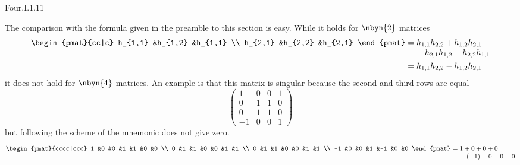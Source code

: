 \begin{ans}{Four.I.1.11}
      \begin{exparts}
        \partsitem The comparison with the formula given in the preamble to
          this section is easy.
        \partsitem While it holds for \( \nbyn{2} \) matrices
          \begin{align*}
            \begin{pmat}{cc|c}
              h_{1,1} &h_{1,2} &h_{1,1} \\
              h_{2,1} &h_{2,2} &h_{2,1}
            \end{pmat}
            &=\begin{array}[t]{@{}l@{}}
              h_{1,1}h_{2,2}+h_{1,2}h_{2,1}  \\
              \>-h_{2,1}h_{1,2}-h_{2,2}h_{1,1}
            \end{array}                                     \\
            &=h_{1,1}h_{2,2}-h_{1,2}h_{2,1}
          \end{align*}
          it does not hold for \( \nbyn{4} \) matrices.
          An example is that this matrix is
          singular because the second and third rows are equal
          \begin{equation*}
            \begin{pmatrix}
              1  &0  &0  &1   \\
              0  &1  &1  &0   \\
              0  &1  &1  &0   \\
             -1  &0  &0  &1
            \end{pmatrix}
          \end{equation*}
          but following the scheme of the mnemonic does not give zero.
          \begin{equation*}
            \begin{pmat}{cccc|ccc}
                       1  &0  &0  &1  &1  &0  &0  \\
                       0  &1  &1  &0  &0  &1  &1  \\
                       0  &1  &1  &0  &0  &1  &1  \\
                      -1  &0  &0  &1  &-1 &0  &0
            \end{pmat}
            =\begin{array}[t]{@{}l@{}}
               1+0+0+0 \\
               \>-(-1)-0-0-0
              \end{array}
           \end{equation*}
      \end{exparts}
     
\end{ans}
